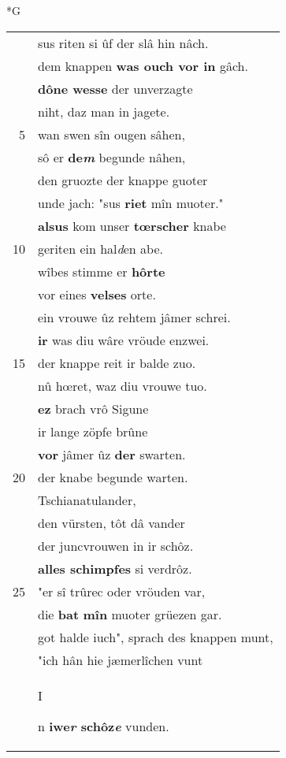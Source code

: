 \documentclass[8pt,a4paper,notitlepage]{article}
\begin{document}
\newpage
\begin{table}[ht]
\begin{minipage}[t]{0.5\linewidth}
\small
\begin{center}*G
\end{center}
\begin{tabular}{rl}
 & sus riten si ûf der slâ hin nâch.\\ 
 & dem knappen \textbf{was ouch vor in} gâch.\\ 
 & \textbf{dône wesse} der unverzagte\\ 
 & niht, daz man in jagete.\\ 
5 & wan swen sîn ougen sâhen,\\ 
 & sô er \textbf{de\textit{m}} begunde nâhen,\\ 
 & den gruozte der knappe guoter\\ 
 & unde jach: "sus \textbf{riet} mîn muoter."\\ 
 & \textbf{alsus} kom unser \textbf{tœrscher} knabe\\ 
10 & geriten ein hal\textit{d}en abe.\\ 
 & wîbes stimme er \textbf{hôrte}\\ 
 & vor eines \textbf{velses} orte.\\ 
 & ein vrouwe ûz rehtem jâmer schrei.\\ 
 & \textbf{ir} was diu wâre vröude enzwei.\\ 
15 & der knappe reit ir balde zuo.\\ 
 & nû hœret, waz diu vrouwe tuo.\\ 
 & \textbf{ez} brach vrô Sigune\\ 
 & ir lange zöpfe brûne\\ 
 & \textbf{vor} jâmer ûz \textbf{der} swarten.\\ 
20 & der knabe begunde warten.\\ 
 & Tschianatulander,\\ 
 & den vürsten, tôt dâ vander\\ 
 & der juncvrouwen in ir schôz.\\ 
 & \textbf{alles schimpfes} si verdrôz.\\ 
25 & "er sî trûrec oder vröuden var,\\ 
 & die \textbf{bat} \textbf{mîn} muoter grüezen gar.\\ 
 & got halde iuch", sprach des knappen munt,\\ 
 & "ich hân hie jæmerlîchen vunt\\ 
 & \begin{large}I\end{large}n \textbf{iwe\textit{r} schôz\textit{e}} vunden.\\ 

\end{tabular}
\end{minipage}
\end{table}
\end{document}
